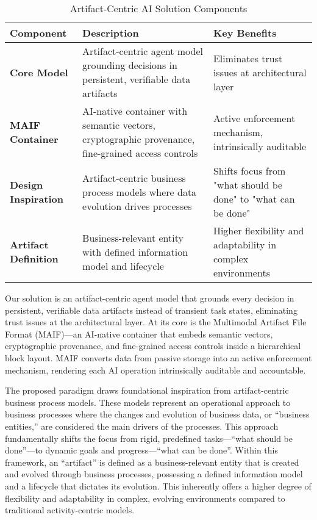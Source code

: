 \documentclass[conference]{IEEEtran}
\begin{document}
\begin{table*}[!t]
\renewcommand{\arraystretch}{1.3}
\caption{Artifact-Centric AI Solution Components}
\label{tab:artifact-centric-solution}
\centering
\footnotesize
\begin{tabular}{p{3cm}p{5.5cm}p{5.5cm}}
\toprule
\textbf{Component} & \textbf{Description} & \textbf{Key Benefits} \\
\midrule
\textbf{Core Model} & Artifact-centric agent model grounding decisions in persistent, verifiable data artifacts & Eliminates trust issues at architectural layer \\
\textbf{MAIF Container} & AI-native container with semantic vectors, cryptographic provenance, fine-grained access controls & Active enforcement mechanism, intrinsically auditable \\
\textbf{Design Inspiration} & Artifact-centric business process models where data evolution drives processes & Shifts focus from "what should be done" to "what can be done" \\
\textbf{Artifact Definition} & Business-relevant entity with defined information model and lifecycle & Higher flexibility and adaptability in complex environments \\
\bottomrule
\end{tabular}
\end{table*}

Our solution is an artifact-centric agent model that grounds every decision in persistent, verifiable data artifacts instead of transient task states, eliminating trust issues at the architectural layer. At its core is the Multimodal Artifact File Format (MAIF)—an AI-native container that embeds semantic vectors, cryptographic provenance, and fine-grained access controls inside a hierarchical block layout. MAIF converts data from passive storage into an active enforcement mechanism, rendering each AI operation intrinsically auditable and accountable.

The proposed paradigm draws foundational inspiration from artifact-centric business process models. These models represent an operational approach to business processes where the changes and evolution of business data, or ``business entities,'' are considered the main drivers of the processes\cite{ref10}. This approach fundamentally shifts the focus from rigid, predefined tasks---``what should be done''---to dynamic goals and progress---``what can be done''\cite{ref12}. Within this framework, an ``artifact'' is defined as a business-relevant entity that is created and evolved through business processes, possessing a defined information model and a lifecycle that dictates its evolution\cite{ref12}. This inherently offers a higher degree of flexibility and adaptability in complex, evolving environments compared to traditional activity-centric models\cite{ref12}.
\end{document}
